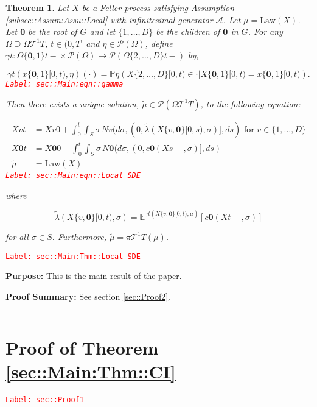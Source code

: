 \documentclass[12pt]{article}
\newcommand{\mb}{\mathbb}
\newcommand{\mc}{\mathcal}
\newcommand{\ra}{\rightarrow}
\newcommand{\te}{\text}
\newcommand{\tr}{\textcolor{red}}
\newcommand{\labe}[1]{\tr{\texttt{Label: #1}}}
\newcommand{\purpose}{\textbf{Purpose: }}
\newcommand{\pfsum}{\textbf{Proof Summary: }}
\newcommand{\lin}{\rule{\linewidth}{0.4 pt}}
\newcommand{\pr}{\mb{P}}							%
\newcommand{\exmu}[2]{\mb{E}^{#1}\left[#2\right]}	%
\newcommand{\pmsr}{\mc{P}}							%
\renewcommand{\root}{\mathbf{0}}				%
\renewcommand{\v}{v}							%
\renewcommand{\S}{S}							%
\newcommand{\s}{\sigma}							%
\newcommand{\T}{T}								%
\newcommand{\x}{x}								%
\renewcommand{\t}{t}							%
\newcommand{\proj}{\pi}							%
\renewcommand{\tt}{s}							%
\newcommand{\X}{X}								%
\newcommand{\IG}{\mc{A}}						%
\newcommand{\IGr}{c}							%
\newcommand{\degr}{D}							%
\newcommand{\tree}{\mc{T}}						%
\newcommand{\sln}[1]{^{#1}}						%
\newcommand{\poiss}{N}							%
\newcommand{\alt}[1]{\widetilde{#1}}			%
\newcommand{\m}{\mu}							%
\newcommand{\mmm}{\eta}							%
\newcommand{\cm}{\gamma}						%
\newcommand{\law}{\te{Law}}						%
\newcommand{\crate}{\alt{\lambda}}				%
\newtheorem{thms}{Theorem}[section]
\begin{document}
\begin{thms}
Let \(\X{}{}\) be a Feller process satisfying Assumption \ref{subsec::Assum:Assu::Local} with infinitesimal generator \(\IG\). Let \(\m{}{}{} = \law(\X{}{})\). Let \(\root\) be the root of \(G\) and let \(\{1,\dots,\degr\}\) be the children of \(\root\) in \(G\). For any \(\Omega \supseteq\Omega{\tree\sln{1}}{\T}\), \(\t\in (0,\T]\) and \(\mmm{}{}{} \in \pmsr(\Omega)\), define \(\cm{\t}:\Omega{\{\root,1\}}{\t-}\times \pmsr(\Omega) \ra \pmsr(\Omega{\{2,\dots,\degr\}}{\t-})\) by,

\begin{equation}
\cm{\t}(\x{\{\root,1\}}{[0,\t)},\mmm{}{}{})(\cdot) = \pr{\mmm{}{}{}}\left(\X{\{2,\dots,\degr\}}{[0,\t)} \in \cdot|\X{\{\root,1\}}{[0,\t)} = \x{\{\root,1\}}{[0,\t)}\right).
\label{sec::Main:eqn::gamma}
\end{equation}
\labe{sec::Main:eqn::gamma}

Then there exists a unique solution, \(\alt{\m{}{}{}} \in \pmsr(\Omega{\tree\sln{1}}{\T})\), to the following equation:

\begin{align}
\X{\v}{\t} &= \X{\v}{0} + \int_0^\t\int_\S \s\,\poiss{\v}(d\s,(0,\crate{}(\X{\{\v,\root\}}{[0,\tt)},\s)],d\tt) \te{ for } \v \in \{1,\dots,\degr\}\nonumber\\
\X{\root}{\t} &= \X{\root}{0} + \int_0^\t\int_\S \s\,\poiss{\root}(d\s,(0,\IGr{\root}(\X{}{\tt-},\s)],d\tt)\nonumber\\
\alt{\m{}{}{}} &= \law(\X{}{})
\label{sec::Main:eqn::Local SDE}
\end{align}
\labe{sec::Main:eqn::Local SDE}

where

\[\crate{}(\X{\{\v,\root\}}{[0,\t)},\s) = \exmu{\cm{\t}(\X{\{\v,\root\}}{[0,\t)},\alt{\m{}{}{}})}{\IGr{\root}(\X{}{\t-},\s)}\]

for all \(\s\in \S\). Furthermore, \(\alt{\m{}{}{}} = \proj{\tree\sln{1}}{\T}(\m{}{}{})\).
\label{sec::Main:Thm::Local SDE}
\end{thms}
\labe{sec::Main:Thm::Local SDE}

\purpose This is the main result of the paper. 

\pfsum See section \ref{sec::Proof2}.

\lin

\section{Proof of Theorem \ref{sec::Main:Thm::CI}}
\label{sec::Proof1}\labe{sec::Proof1}
\end{document}
